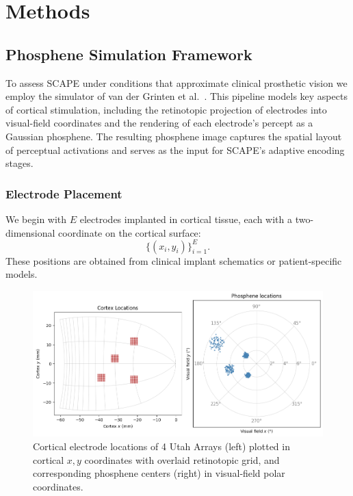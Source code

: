 \section{Methods}

\subsection{Phosphene Simulation Framework}
To assess SCAPE under conditions that approximate clinical prosthetic vision we employ the simulator of van der Grinten et al.\ \cite{vanderGrinten2024}. This pipeline models key aspects of cortical stimulation, including the retinotopic projection of electrodes into visual-field coordinates and the rendering of each electrode’s percept as a Gaussian phosphene. The resulting phosphene image captures the spatial layout of perceptual activations and serves as the input for SCAPE’s adaptive encoding stages.


\subsubsection{Electrode Placement}
We begin with \(E\) electrodes implanted in cortical tissue, each with a two-dimensional coordinate on the cortical surface:
\[
\{(x_i,y_i)\}_{i=1}^E.
\]
These positions are obtained from clinical implant schematics or patient-specific models.


\begin{figure}[h]
  \centering
  \includegraphics[width=0.9\columnwidth]{figures/cortextophosphenelocations4utaharrays.png}
  \caption{Cortical electrode locations of 4 Utah Arrays (left) plotted in cortical \(x,y\) coordinates with overlaid retinotopic grid, and corresponding phosphene centers (right) in visual‐field polar coordinates.}
  \label{fig:cortex-phosphene-locations}
\end{figure}


